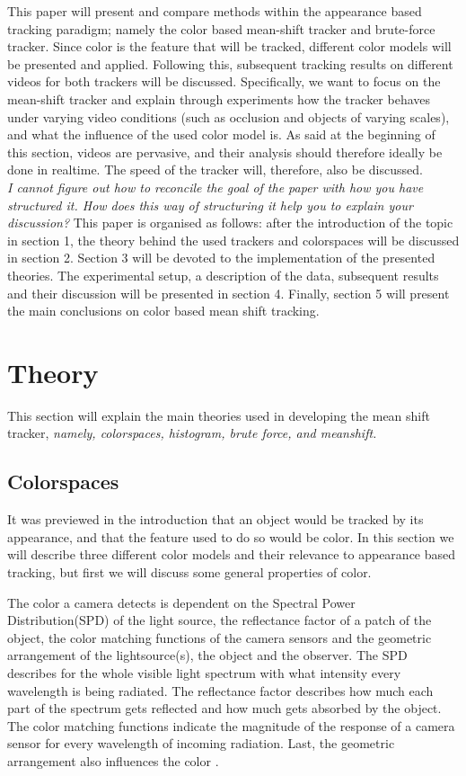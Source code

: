 \documentclass[a4paper,11pt]{article}
\begin{document}
	This paper will present and compare methods within the appearance based tracking paradigm; namely the color based mean-shift tracker and brute-force tracker. 
	Since color is the feature that will be tracked, different color models will be presented and applied. Following this, subsequent tracking results on different videos for both trackers will be discussed.
	Specifically, we want to focus on the mean-shift tracker and explain through experiments how the tracker behaves under varying video conditions (such as occlusion and objects of varying scales), and what the influence of the used color model is.
	As said at the beginning of this section, videos are pervasive, and their analysis should therefore ideally be done in realtime. The speed of the tracker will, therefore, also be discussed. \\
\textit{I cannot figure out how to reconcile the goal of the paper with how you have structured it. How does this way of structuring it help you to explain your discussion?}
	This paper is organised as follows:  after the introduction of the topic in section 1, the theory behind the used trackers and colorspaces will be discussed in section 2.
	Section 3 will be devoted to the implementation of the presented theories. The experimental setup, a description of the data, subsequent results and their discussion will be presented in section 4. 
	Finally, section 5 will present the main conclusions on color based mean shift tracking.

\section{Theory}	
	This section will explain the main theories used in developing the mean shift tracker, \textit{namely, colorspaces, histogram, brute force, and meanshift.} 
	\subsection{Colorspaces}
		It was previewed in the introduction that an object would be tracked by its appearance, and that the feature used to do so would be color. In this section we will describe three different color models and their relevance to appearance based tracking, but first we will discuss some general properties of color.

The color a camera detects is dependent on the Spectral Power Distribution(SPD) of the light source, the reflectance factor of a patch of the object, the color matching functions of the camera sensors and the geometric arrangement of the lightsource(s), the object and the observer. The SPD describes for the whole visible light spectrum with what intensity every wavelength is being radiated. The reflectance factor  describes how much each part of the spectrum gets reflected and how much gets absorbed by the object. The color matching functions indicate the magnitude of the response of a camera sensor for every wavelength of incoming radiation. Last, the geometric arrangement also influences the color \cite{gevers_color}.
\end{document}
